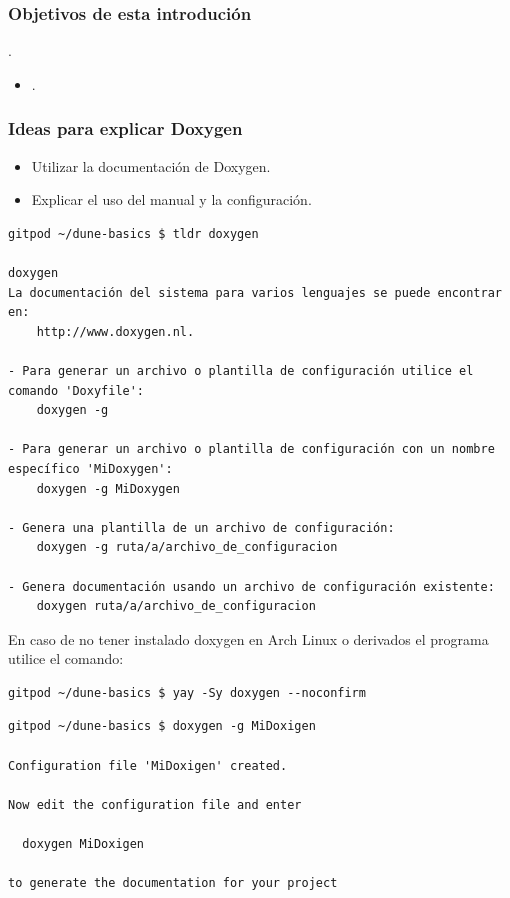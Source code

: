 




\begin{frame}
	\frametitle{Objetivos de esta introdución}
	.
	\begin{itemize}
		\item .
	\end{itemize}
\end{frame}

\begin{frame}
	\frametitle{Ideas para explicar Doxygen}
	\begin{itemize}
		\item
		
		Utilizar la documentación de Doxygen.
		
		\item
		
		Explicar el uso del manual y la configuración.
	\end{itemize}
\end{frame}

\begin{frame}[fragile]\LARGE
	\begin{lstlisting}
gitpod ~/dune-basics $ tldr doxygen

doxygen
La documentación del sistema para varios lenguajes se puede encontrar en: 
	http://www.doxygen.nl.

- Para generar un archivo o plantilla de configuración utilice el comando 'Doxyfile':
	doxygen -g

- Para generar un archivo o plantilla de configuración con un nombre específico 'MiDoxygen':
	doxygen -g MiDoxygen

- Genera una plantilla de un archivo de configuración:
	doxygen -g ruta/a/archivo_de_configuracion

- Genera documentación usando un archivo de configuración existente:
	doxygen ruta/a/archivo_de_configuracion
\end{lstlisting}
\end{frame}

\begin{frame}[fragile]
	En caso de no tener instalado doxygen en Arch Linux o derivados el programa utilice el comando:\LARGE
	\begin{lstlisting}
gitpod ~/dune-basics $ yay -Sy doxygen --noconfirm
\end{lstlisting}

	\begin{lstlisting}
gitpod ~/dune-basics $ doxygen -g MiDoxigen

Configuration file 'MiDoxigen' created.

Now edit the configuration file and enter

  doxygen MiDoxigen

to generate the documentation for your project
\end{lstlisting}
\end{frame}

